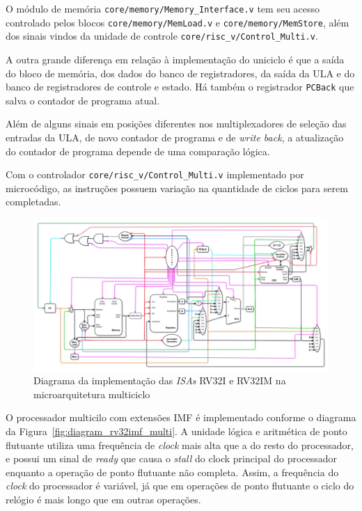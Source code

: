         {
            O módulo de memória \texttt{core/memory/Memory\_Interface.v} tem seu
            acesso controlado pelos blocos \texttt{core/memory/MemLoad.v} e
            \texttt{core/memory/MemStore}, além dos sinais vindos da unidade de
            controle \texttt{core/risc\_v/Control\_Multi.v}.
        }

        { A outra grande diferença em relação à implementação do uniciclo é que a
            saída do bloco de memória, dos dados do banco de registradores, da saída
            da ULA e do banco de registradores de controle e estado. Há também
            o registrador \texttt{PCBack} que salva o contador de programa atual.
        }

        { Além de alguns sinais em posições diferentes nos multiplexadores de seleção
            das entradas da ULA, de novo contador de programa e de \textit{write back},
            a atualização do contador de programa depende de uma comparação lógica.
        }

        { Com o controlador \texttt{core/risc\_v/Control\_Multi.v} implementado
            por microcódigo, as instruções possuem variação na quantidade de
            ciclos para serem completadas.
        }

        \begin{figure}[H]
        \centering
            \includegraphics[width=.9\linewidth]{../images/uarch_diagrams/multicycle-RV32I-RV32IM.png}
            \caption{Diagrama da implementação das \textit{ISAs} RV32I e RV32IM na
            microarquitetura multiciclo}\label{fig:diagram_rv32i_multi}
        \end{figure}

        { O processador multicilo com extensões IMF é implementado conforme o
            diagrama da Figura~\ref{fig:diagram_rv32imf_multi}. A unidade lógica
            e aritmética de ponto flutuante utiliza uma frequência de \textit{clock}
            mais alta que a do resto do processador, e possui um sinal de
            \textit{ready} que causa o \textit{stall} do clock principal do
            processador enquanto a operação de ponto flutuante não completa.
            Assim, a frequência do \textit{clock} do processador é variável, já
            que em operações de ponto flutuante o ciclo do relógio é mais longo
            que em outras operações.
        }

